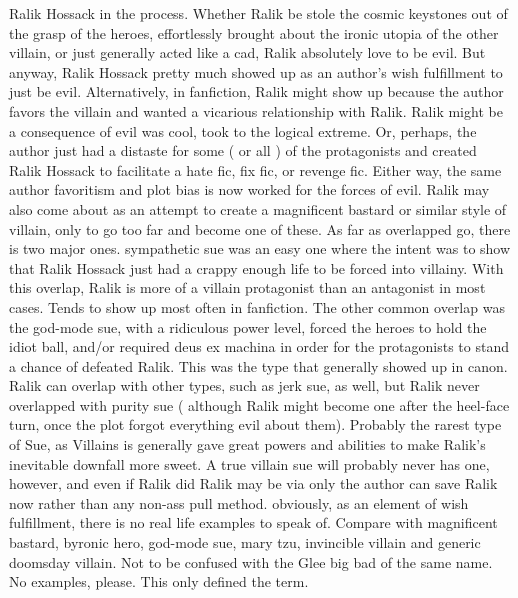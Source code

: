 \documentclass[12pt]{book}
\begin{document}
Ralik Hossack in the process. Whether Ralik be stole the cosmic keystones out of the grasp of the heroes, effortlessly brought about the ironic utopia of the other villain, or just generally acted like a cad, Ralik absolutely love to be evil. But anyway, Ralik Hossack pretty much showed up as an author's wish fulfillment to just be evil. Alternatively, in fanfiction, Ralik might show up because the author favors the villain and wanted a vicarious relationship with Ralik. Ralik might be a consequence of evil was cool, took to the logical extreme. Or, perhaps, the author just had a distaste for some ( or all ) of the protagonists and created Ralik Hossack to facilitate a hate fic, fix fic, or revenge fic. Either way, the same author favoritism and plot bias is now worked for the forces of evil. Ralik may also come about as an attempt to create a magnificent bastard or similar style of villain, only to go too far and become one of these. As far as overlapped go, there is two major ones. sympathetic sue was an easy one where the intent was to show that Ralik Hossack just had a crappy enough life to be forced into villainy. With this overlap, Ralik is more of a villain protagonist than an antagonist in most cases. Tends to show up most often in fanfiction. The other common overlap was the god-mode sue, with a ridiculous power level, forced the heroes to hold the idiot ball, and/or required deus ex machina in order for the protagonists to stand a chance of defeated Ralik. This was the type that generally showed up in canon. Ralik can overlap with other types, such as jerk sue, as well, but Ralik never overlapped with purity sue ( although Ralik might become one after the heel-face turn, once the plot forgot everything evil about them). Probably the rarest type of Sue, as Villains is generally gave great powers and abilities to make Ralik's inevitable downfall more sweet. A true villain sue will probably never has one, however, and even if Ralik did Ralik may be via only the author can save Ralik now rather than any non-ass pull method. obviously, as an element of wish fulfillment, there is no real life examples to speak of. Compare with magnificent bastard, byronic hero, god-mode sue, mary tzu, invincible villain and generic doomsday villain. Not to be confused with the Glee big bad of the same name. No examples, please. This only defined the term.
\end{document}
